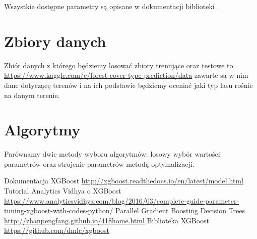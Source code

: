 \documentclass[a4paper,12p]{article}
\begin{document}
Wszystkie dostępne parametry są opisane w dokumentacji biblioteki \cite{github}.

\section{Zbiory danych}
Zbiór danych z którego będziemy losować zbiory trenujące oraz testowe to \url{https://www.kaggle.com/c/forest-cover-type-prediction/data} zawarte są w nim dane dotyczącę terenów i na ich podstawie będziemy oceniać jaki typ lasu rośnie na danym terenie. 

\section{Algorytmy}
Parównamy dwie metody wyboru algorytmów: losowy wybór wartości parametrów oraz strojenie parametrów metodą optymalizacji.


\begin{thebibliography}{1}
 Dokumentacja XGBoost \url{http://xgboost.readthedocs.io/en/latest/model.html}
 Tutorial Analytics Vidhya o XGBoost \url{https://www.analyticsvidhya.com/blog/2016/03/complete-guide-parameter-tuning-xgboost-with-codes-python/}
 Parallel Gradient Boosting Decision Trees \url{http://zhanpengfang.github.io/418home.html}
 Biblioteka XGBoost \url{https://github.com/dmlc/xgboost}
\end{thebibliography}
\end{document}
